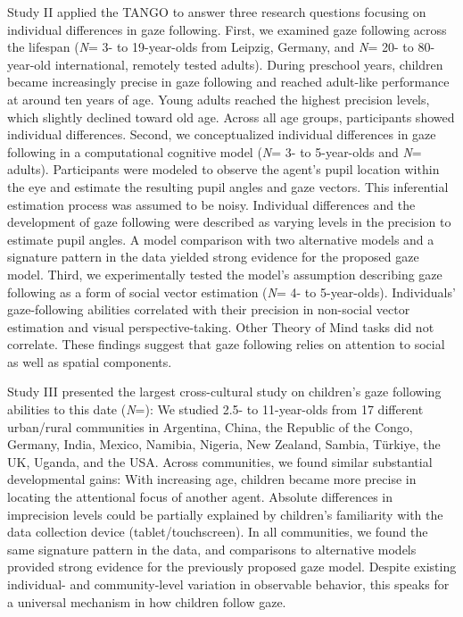\documentclass[
]{scrbook}
\begin{document}
Study II applied the TANGO to answer three research questions focusing on individual differences in gaze following. First, we examined gaze following across the lifespan (\emph{N}\thinspace = 3- to 19-year-olds from Leipzig, Germany, and \emph{N}\thinspace = 20- to 80-year-old international, remotely tested adults). During preschool years, children became increasingly precise in gaze following and reached adult-like performance at around ten years of age. Young adults reached the highest precision levels, which slightly declined toward old age. Across all age groups, participants showed individual differences. Second, we conceptualized individual differences in gaze following in a computational cognitive model (\emph{N}\thinspace = 3- to 5-year-olds and \emph{N}\thinspace = adults). Participants were modeled to observe the agent's pupil location within the eye and estimate the resulting pupil angles and gaze vectors. This inferential estimation process was assumed to be noisy. Individual differences and the development of gaze following were described as varying levels in the precision to estimate pupil angles. A model comparison with two alternative models and a signature pattern in the data yielded strong evidence for the proposed gaze model. Third, we experimentally tested the model's assumption describing gaze following as a form of social vector estimation (\emph{N}\thinspace = 4- to 5-year-olds). Individuals' gaze-following abilities correlated with their precision in non-social vector estimation and visual perspective-taking. Other Theory of Mind tasks did not correlate. These findings suggest that gaze following relies on attention to social as well as spatial components.

Study III presented the largest cross-cultural study on children's gaze following abilities to this date (\emph{N}\thinspace =): We studied 2.5- to 11-year-olds from 17 different urban/rural communities in Argentina, China, the Republic of the Congo, Germany, India, Mexico, Namibia, Nigeria, New Zealand, Sambia, Türkiye, the UK, Uganda, and the USA. Across communities, we found similar substantial developmental gains: With increasing age, children became more precise in locating the attentional focus of another agent. Absolute differences in imprecision levels could be partially explained by children's familiarity with the data collection device (tablet/touchscreen). In all communities, we found the same signature pattern in the data, and comparisons to alternative models provided strong evidence for the previously proposed gaze model. Despite existing individual- and community-level variation in observable behavior, this speaks for a universal mechanism in how children follow gaze.
\end{document}
